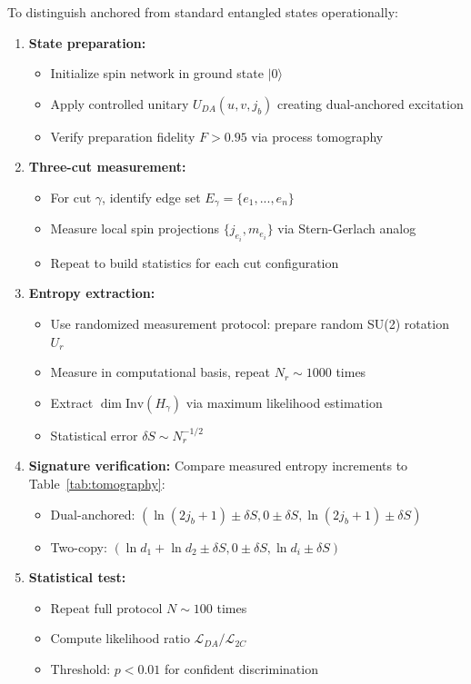 \documentclass[11pt]{article}
\newcommand{\Inv}{\mathrm{Inv}}
\theoremstyle{plain}
\theoremstyle{definition}
\begin{document}
To distinguish anchored from standard entangled states operationally:
\begin{enumerate}
  \item \textbf{State preparation:}
    \begin{itemize}
      \item Initialize spin network in ground state $|0\rangle$
      \item Apply controlled unitary $U_{DA}(u,v,j_b)$ creating dual-anchored excitation
      \item Verify preparation fidelity $F > 0.95$ via process tomography
    \end{itemize}

  \item \textbf{Three-cut measurement:}
    \begin{itemize}
      \item For cut $\gamma$, identify edge set $E_\gamma = \{e_1, ..., e_n\}$
      \item Measure local spin projections $\{j_{e_i}, m_{e_i}\}$ via Stern-Gerlach analog
      \item Repeat to build statistics for each cut configuration
    \end{itemize}

  \item \textbf{Entropy extraction:}
    \begin{itemize}
      \item Use randomized measurement protocol: prepare random SU(2) rotation $U_r$
      \item Measure in computational basis, repeat $N_r \sim 1000$ times
      \item Extract $\dim\Inv(H_\gamma)$ via maximum likelihood estimation
      \item Statistical error $\delta S \sim N_r^{-1/2}$
    \end{itemize}

  \item \textbf{Signature verification:} Compare measured entropy increments to Table~\ref{tab:tomography}:
    \begin{itemize}
      \item Dual-anchored: $(\ln(2j_b+1) \pm \delta S, 0 \pm \delta S, \ln(2j_b+1) \pm \delta S)$
      \item Two-copy: $(\ln d_1 + \ln d_2 \pm \delta S, 0 \pm \delta S, \ln d_i \pm \delta S)$
    \end{itemize}

  \item \textbf{Statistical test:}
    \begin{itemize}
      \item Repeat full protocol $N \sim 100$ times
      \item Compute likelihood ratio $\mathcal{L}_{DA}/\mathcal{L}_{2C}$
      \item Threshold: $p < 0.01$ for confident discrimination
    \end{itemize}
\end{enumerate}
\end{document}

